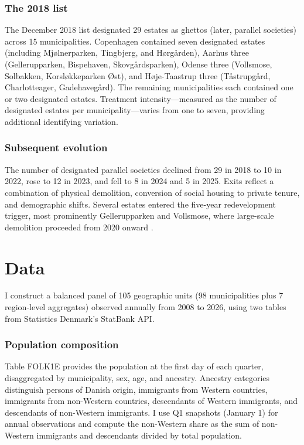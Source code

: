 \documentclass[12pt]{article}
\begin{document}
\subsubsection*{The 2018 list} The December 2018 list designated 29 estates as ghettos (later, parallel societies) across 15 municipalities. Copenhagen contained seven designated estates (including Mj{\o}lnerparken, Tingbjerg, and H{\o}rg{\aa}rden), Aarhus three (Gellerupparken, Bispehaven, Skovg{\aa}rdsparken), Odense three (Vollsmose, Solbakken, Korsl{\o}kkeparken {\O}st), and H{\o}je-Taastrup three (T{\aa}strupg{\aa}rd, Charlotteager, Gadehaveg{\aa}rd). The remaining municipalities each contained one or two designated estates. Treatment intensity---measured as the number of designated estates per municipality---varies from one to seven, providing additional identifying variation.

\subsubsection*{Subsequent evolution} The number of designated parallel societies declined from 29 in 2018 to 10 in 2022, rose to 12 in 2023, and fell to 8 in 2024 and 5 in 2025. Exits reflect a combination of physical demolition, conversion of social housing to private tenure, and demographic shifts. Several estates entered the five-year redevelopment trigger, most prominently Gellerupparken and Vollsmose, where large-scale demolition proceeded from 2020 onward \citep{abdelaziz2022urban}.

\section{Data}

I construct a balanced panel of 105 geographic units (98 municipalities plus 7 region-level aggregates) observed annually from 2008 to 2026, using two tables from Statistics Denmark's StatBank API.

\subsubsection*{Population composition} Table FOLK1E provides the population at the first day of each quarter, disaggregated by municipality, sex, age, and ancestry. Ancestry categories distinguish persons of Danish origin, immigrants from Western countries, immigrants from non-Western countries, descendants of Western immigrants, and descendants of non-Western immigrants. I use Q1 snapshots (January 1) for annual observations and compute the non-Western share as the sum of non-Western immigrants and descendants divided by total population.
\end{document}
